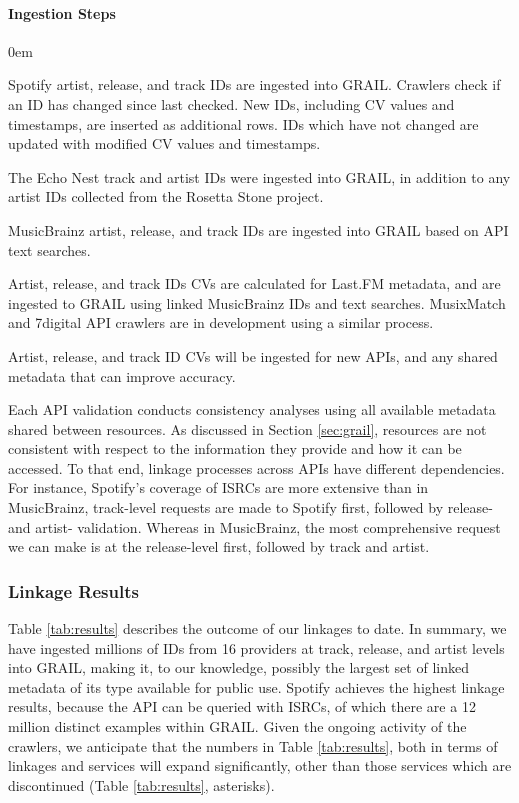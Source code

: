 \documentclass[a4paper]{article}
\begin{document}
\paragraph{Ingestion Steps}
\begin{description}\itemsep0em 
\item[Step A.] Spotify artist, release, and track IDs are ingested into \Gls{GRAIL}. Crawlers check if an ID has changed since last checked. New IDs, including CV values and timestamps, are inserted as additional rows. IDs which have not changed are updated with modified CV values and timestamps.
\item[Step B.] The Echo Nest track and artist IDs were ingested into \Gls{GRAIL}, in addition to any artist IDs collected from the Rosetta Stone project.
\item[Step C.] MusicBrainz artist, release, and track IDs are ingested into \Gls{GRAIL} based on \Gls{API} text searches.
\item[Step D.] Artist, release, and track IDs CVs are calculated for Last.FM metadata, and are ingested to \Gls{GRAIL} using linked MusicBrainz IDs and text searches. MusixMatch and 7digital \Gls{API} crawlers are in development using a similar process.
\item[Step E.] Artist, release, and track ID CVs will be ingested for new \Gls{API}s, and any shared metadata that can improve accuracy.
\end{description}

Each API validation conducts consistency analyses using all available metadata shared between resources. As discussed in Section \ref{sec:grail}, resources are not consistent with respect to the information they provide and how it can be accessed. To that end, linkage processes across APIs have different dependencies. For instance, Spotify's coverage of \Gls{ISRC}s are more extensive than in MusicBrainz, track-level requests are made to Spotify first, followed by release- and artist- validation. Whereas in MusicBrainz, the most comprehensive request we can make is at the release-level first, followed by track and artist.

\subsubsection{Linkage Results}
Table \ref{tab:results} describes the outcome of our linkages to date. In summary, we have ingested millions of IDs from 16 providers at track, release, and artist levels into \Gls{GRAIL}, making it, to our knowledge, possibly the largest set of linked metadata of its type available for public use. Spotify achieves the highest linkage results, because the \Gls{API} can be queried with \Gls{ISRC}s, of which there are a 12 million distinct examples within \Gls{GRAIL}. Given the ongoing activity of the crawlers, we anticipate that the numbers in Table \ref{tab:results}, both in terms of linkages and services will expand significantly, other than those services which are discontinued (Table \ref{tab:results}, asterisks).
\end{document}
